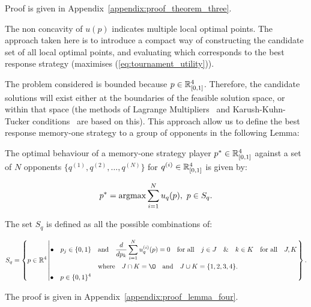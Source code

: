 Proof is given in Appendix~\ref{appendix:proof_theorem_three}.

The non concavity of \(u(p)\) indicates multiple local optimal points. The
approach taken here is to introduce a compact way of constructing the candidate
set of all local optimal points, and evaluating which corresponds to the best response
strategy (maximises (\ref{eq:tournament_utility})).

The problem considered is bounded because \(p \in \mathbb{R}^4_{[0, 1]}\).
Therefore, the candidate solutions will exist either at the boundaries of the
feasible solution space, or within that space (the methods of Lagrange
Multipliers~\cite{bertsekas2014} and Karush-Kuhn-Tucker
conditions~\cite{Giorgi2016} are based on this). This approach allow us to
define the best response memory-one strategy to a group of opponents in the
following Lemma:

\begin{lemma}\label{lemma:memone_group_best_response}

    The optimal behaviour of a memory-one strategy player
    \(p^* \in \mathbb{R}_{[0, 1]} ^ 4\)
    against a set of \(N\) opponents \(\{q^{(1)}, q^{(2)}, \dots, q^{(N)} \}\)
    for \(q^{(i)} \in \mathbb{R}_{[0, 1]} ^ 4\) is given by:

    \[p^* = \textnormal{argmax}\sum\limits_{i=1} ^ N  u_q(p), \ p \in S_q.\]

    The set \(S_q\) is defined as all the possible combinations of:

    \begin{equation}\label{eq:s_q_set}
        S_q =
        \left\{p \in \mathbb{R} ^ 4 \left|
            \begin{aligned}
                \bullet\quad p_j \in \{0, 1\} & \quad \text{and} \quad \frac{d}{dp_k} 
                \sum\limits_{i=1} ^ N  u_q^{(i)}(p) = 0
                \quad \text{for all} \quad j \in J \quad \&  \quad k \in K  \quad \text{for all} \quad J, K \\
                & \quad \text{where} \quad J \cap K = \O \quad
                \text{and} \quad J \cup K = \{1, 2, 3, 4\}.\\
                \bullet\quad  p \in \{0, 1\} ^ 4
            \end{aligned}\right.
        \right\}.
    \end{equation}
\end{lemma}

The proof is given in Appendix~\ref{appendix:proof_lemma_four}.

